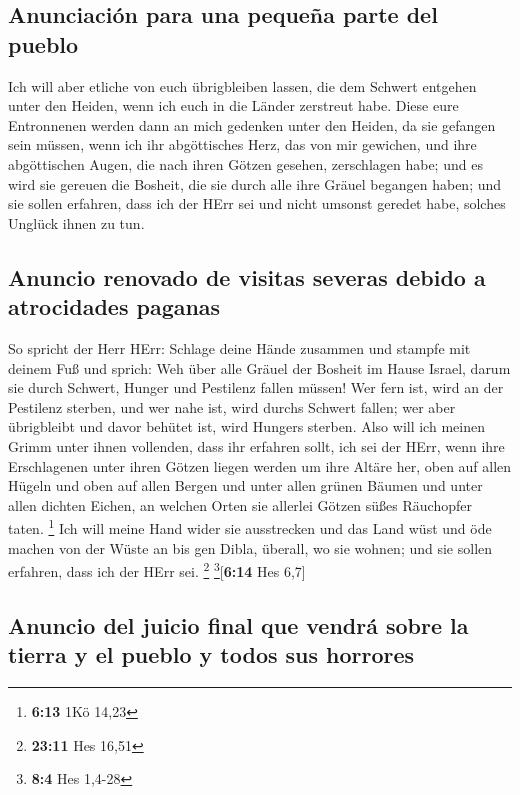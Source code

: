\hypertarget{anunciaciuxf3n-para-una-pequeuxf1a-parte-del-pueblo}{%
\subsection{Anunciación para una pequeña parte del
pueblo}\label{anunciaciuxf3n-para-una-pequeuxf1a-parte-del-pueblo}}

 Ich will aber etliche von euch übrigbleiben lassen, die
dem Schwert entgehen unter den Heiden, wenn ich euch in die Länder
zerstreut habe.  Diese eure Entronnenen werden dann an
mich gedenken unter den Heiden, da sie gefangen sein müssen, wenn ich
ihr abgöttisches Herz, das von mir gewichen, und ihre abgöttischen
Augen, die nach ihren Götzen gesehen, zerschlagen habe; und es wird sie
gereuen die Bosheit, die sie durch alle ihre Gräuel begangen haben;
 und sie sollen erfahren, dass ich der HErr sei und nicht
umsonst geredet habe, solches Unglück ihnen zu tun.

\hypertarget{anuncio-renovado-de-visitas-severas-debido-a-atrocidades-paganas}{%
\subsection{Anuncio renovado de visitas severas debido a atrocidades
paganas}\label{anuncio-renovado-de-visitas-severas-debido-a-atrocidades-paganas}}

 So spricht der Herr HErr: Schlage deine Hände zusammen
und stampfe mit deinem Fuß und sprich: Weh über alle Gräuel der Bosheit
im Hause Israel, darum sie durch Schwert, Hunger und Pestilenz fallen
müssen!  Wer fern ist, wird an der Pestilenz sterben, und
wer nahe ist, wird durchs Schwert fallen; wer aber übrigbleibt und davor
behütet ist, wird Hungers sterben. Also will ich meinen Grimm unter
ihnen vollenden,  dass ihr erfahren sollt, ich sei der
HErr, wenn ihre Erschlagenen unter ihren Götzen liegen werden um ihre
Altäre her, oben auf allen Hügeln und oben auf allen Bergen und unter
allen grünen Bäumen und unter allen dichten Eichen, an welchen Orten sie
allerlei Götzen süßes Räuchopfer taten. \footnote{\textbf{6:13} 1Kö
  14,23}  Ich will meine Hand wider sie ausstrecken und
das Land wüst und öde machen von der Wüste an bis gen Dibla, überall, wo
sie wohnen; und sie sollen erfahren, dass ich der HErr sei. \footnote{\textbf{23:11}
  Hes 16,51} \footnote{\textbf{8:4} Hes 1,4-28}{[}\textbf{6:14} Hes
6,7{]}

\hypertarget{anuncio-del-juicio-final-que-vendruxe1-sobre-la-tierra-y-el-pueblo-y-todos-sus-horrores}{%
\subsection{Anuncio del juicio final que vendrá sobre la tierra y el
pueblo y todos sus
horrores}\label{anuncio-del-juicio-final-que-vendruxe1-sobre-la-tierra-y-el-pueblo-y-todos-sus-horrores}}

